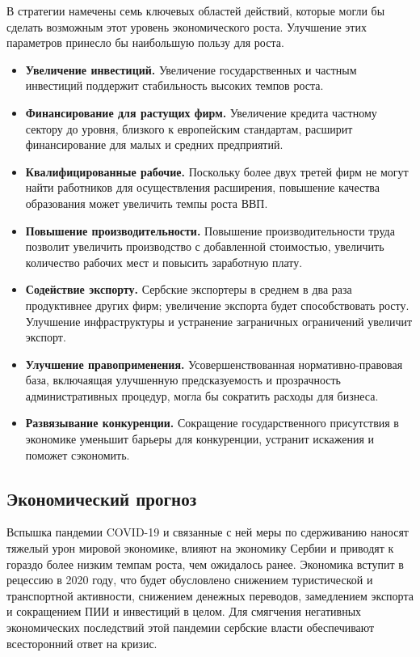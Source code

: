 В стратегии намечены семь ключевых областей действий, которые могли бы сделать возможным этот уровень экономического роста.
Улучшение этих параметров принесло бы наибольшую пользу для роста.
\begin{itemize}
	\item \textbf{Увеличение инвестиций.}
	Увеличение государственных и частным инвестиций поддержит стабильность высоких темпов роста.
	\item \textbf{Финансирование для растущих фирм.}
	Увеличение кредита частному сектору до уровня, близкого к европейским стандартам, расширит финансирование для малых и средних предприятий.
	\item \textbf{Квалифицированные рабочие.}
	Поскольку более двух третей фирм не могут найти работников для осуществления расширения, повышение качества образования может увеличить темпы роста ВВП.
	\item \textbf{Повышение производительности.}
	Повышение производительности труда позволит увеличить производство с добавленной стоимостью, увеличить количество рабочих мест и повысить заработную плату.
	\item \textbf{Содействие экспорту.}
	Сербские экспортеры в среднем в два раза продуктивнее других фирм; увеличение экспорта будет способствовать росту.
	Улучшение инфраструктуры и устранение заграничных ограничений увеличит экспорт.
	\item \textbf{Улучшение правоприменения.}
	Усовершенствованная нормативно-правовая база, включаящая улучшенную предсказуемость и прозрачность административных процедур, могла бы сократить расходы для бизнеса.
	\item \textbf{Развязывание конкуренции.}
	Сокращение государственного присутствия в экономике уменьшит барьеры для конкуренции, устранит искажения и поможет сэкономить.
\end{itemize}

\subsection{Экономический прогноз}

Вспышка пандемии COVID-19 и связанные с ней меры по сдерживанию наносят тяжелый урон мировой экономике, влияют на экономику Сербии и приводят к гораздо более низким темпам роста, чем ожидалось ранее.
Экономика вступит в рецессию в 2020 году, что будет обусловлено снижением туристической и транспортной активности, снижением денежных переводов, замедлением экспорта и сокращением ПИИ и инвестиций в целом. Для смягчения негативных экономических последствий этой пандемии сербские власти обеспечивают всесторонний ответ на кризис.


